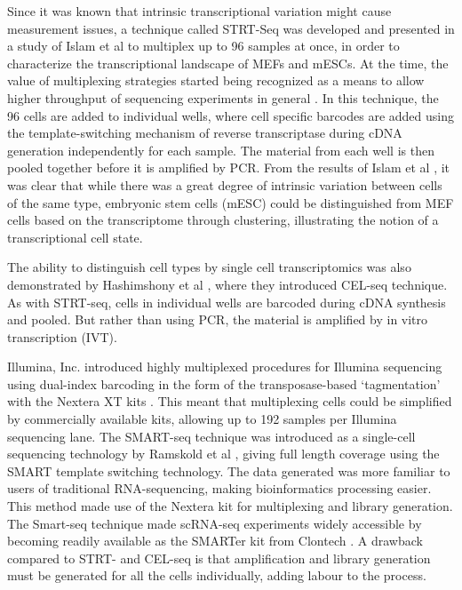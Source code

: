 Since it was known that intrinsic transcriptional variation might cause measurement issues, a technique called STRT-Seq was developed and presented in a study of Islam et al \cite{Islam2011-yy} to multiplex up to 96 samples at once, in order to characterize the transcriptional landscape of MEFs and mESCs. At the time, the value of multiplexing strategies started being recognized as a means to allow higher throughput of sequencing experiments in general \cite{Kozarewa2011-we}. In this technique, the 96 cells are added to individual wells, where cell specific barcodes are added using the template-switching mechanism of reverse transcriptase during cDNA generation independently for each sample. The material from each well is then pooled together before it is amplified by PCR. From the results of Islam et al \cite{Islam2011-yy}, it was clear that while there was a great degree of intrinsic variation between cells of the same type, embryonic stem cells (mESC) could be distinguished from MEF cells based on the transcriptome through clustering, illustrating the notion of a transcriptional cell state.

The ability to distinguish cell types by single cell transcriptomics was also demonstrated by Hashimshony et al \cite{Hashimshony2012-am}, where they introduced CEL-seq technique. As with STRT-seq, cells in individual wells are barcoded during cDNA synthesis and pooled. But rather than using PCR, the material is amplified by in vitro transcription (IVT).

Illumina, Inc. introduced highly multiplexed procedures for Illumina sequencing using dual-index barcoding in the form of the transposase-based ‘tagmentation’ with the Nextera XT kits \cite{Illumina_Inc2012-mf}. This meant that multiplexing cells could be simplified by commercially available kits, allowing up to 192 samples per Illumina sequencing lane. The SMART-seq technique was introduced as a single-cell sequencing technology by Ramskold et al \cite{Ramskold2012-zc}, giving full length coverage using the SMART template switching technology. The data generated was more familiar to users of traditional RNA-sequencing, making bioinformatics processing easier. This method made use of the Nextera kit for multiplexing and library generation. The Smart-seq technique made scRNA-seq experiments widely accessible by becoming readily available as the SMARTer kit from Clontech \cite{Clontech_Laboratories_Inc2013-zf}. A drawback compared to STRT- and CEL-seq is that amplification and library generation must be generated for all the cells individually, adding labour to the process.

